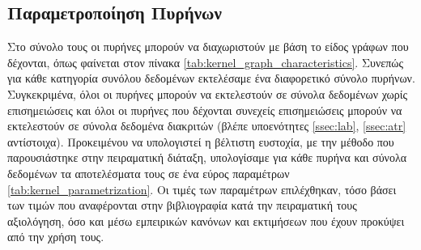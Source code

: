\subsection{Παραμετροποίηση Πυρήνων}
Στο σύνολο τους οι πυρήνες μπορούν να διαχωριστούν με βάση το είδος γράφων που δέχονται, όπως φαίνεται στον πίνακα \ref{tab:kernel_graph_characteristics}.
Συνεπώς για κάθε κατηγορία συνόλου δεδομένων εκτελέσαμε ένα διαφορετικό σύνολο πυρήνων.
Συγκεκριμένα, όλοι οι πυρήνες μπορούν να εκτελεστούν σε σύνολα δεδομένων χωρίς επισημειώσεις και όλοι οι πυρήνες που δέχονται συνεχείς επισημειώσεις μπορούν να εκτελεστούν σε σύνολα δεδομένα διακριτών (βλέπε υποενότητες \ref{ssec:lab}, \ref{ssec:atr} αντίστοιχα).
Προκειμένου να υπολογιστεί η βέλτιστη ευστοχία, με την μέθοδο που παρουσιάστηκε στην πειραματική διάταξη, υπολογίσαμε για κάθε πυρήνα και σύνολα δεδομένων τα αποτελέσματα τους σε ένα εύρος παραμέτρων \ref{tab:kernel_parametrization}.
Οι τιμές των παραμέτρων επιλέχθηκαν, τόσο βάσει των τιμών που αναφέρονται στην βιβλιογραφία κατά την πειραματική τους αξιολόγηση, όσο και μέσω εμπειρικών κανόνων και εκτιμήσεων που έχουν προκύψει από την χρήση τους.
